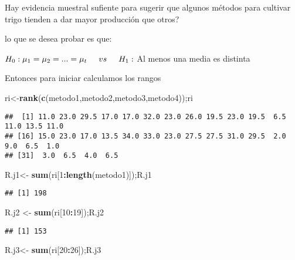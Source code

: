\documentclass[
]{article}
\newenvironment{Shaded}{\begin{snugshade}}{\end{snugshade}}
\newcommand{\DecValTok}[1]{\textcolor[rgb]{0.00,0.00,0.81}{#1}}
\newcommand{\FunctionTok}[1]{\textcolor[rgb]{0.13,0.29,0.53}{\textbf{#1}}}
\newcommand{\NormalTok}[1]{#1}
\newcommand{\OtherTok}[1]{\textcolor[rgb]{0.56,0.35,0.01}{#1}}
\newcommand{\SpecialCharTok}[1]{\textcolor[rgb]{0.81,0.36,0.00}{\textbf{#1}}}
\begin{document}
Hay evidencia muestral sufiente para sugerir que algunos métodos para
cultivar trigo tienden a dar mayor producción que otros?

lo que se desea probar es que:

\(H_0 :\mu_1=\mu_2=...=\mu_t \hspace{0.5cm} vs \hspace{0.5cm} H_1 :\) Al
menos una media es distinta

Entonces para iniciar calculamos los rangos

\begin{Shaded}
\begin{Highlighting}[]
\NormalTok{ri}\OtherTok{\textless{}{-}}\FunctionTok{rank}\NormalTok{(}\FunctionTok{c}\NormalTok{(metodo1,metodo2,metodo3,metodo4));ri}
\end{Highlighting}
\end{Shaded}

\begin{verbatim}
##  [1] 11.0 23.0 29.5 17.0 17.0 32.0 23.0 26.0 19.5 23.0 19.5  6.5 11.0 13.5 11.0
## [16] 15.0 23.0 17.0 13.5 34.0 33.0 23.0 27.5 27.5 31.0 29.5  2.0  9.0  6.5  1.0
## [31]  3.0  6.5  4.0  6.5
\end{verbatim}

\begin{Shaded}
\begin{Highlighting}[]
\NormalTok{R.j1}\OtherTok{\textless{}{-}} \FunctionTok{sum}\NormalTok{(ri[}\DecValTok{1}\SpecialCharTok{:}\FunctionTok{length}\NormalTok{(metodo1)]);R.j1}
\end{Highlighting}
\end{Shaded}

\begin{verbatim}
## [1] 198
\end{verbatim}

\begin{Shaded}
\begin{Highlighting}[]
\NormalTok{R.j2 }\OtherTok{\textless{}{-}} \FunctionTok{sum}\NormalTok{(ri[}\DecValTok{10}\SpecialCharTok{:}\DecValTok{19}\NormalTok{]);R.j2}
\end{Highlighting}
\end{Shaded}

\begin{verbatim}
## [1] 153
\end{verbatim}

\begin{Shaded}
\begin{Highlighting}[]
\NormalTok{R.j3}\OtherTok{\textless{}{-}} \FunctionTok{sum}\NormalTok{(ri[}\DecValTok{20}\SpecialCharTok{:}\DecValTok{26}\NormalTok{]);R.j3}
\end{Highlighting}
\end{Shaded}
\end{document}

